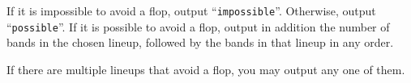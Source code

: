 
	If it is impossible to avoid a flop, output ``\texttt{impossible}''.
	Otherwise, output ``\texttt{possible}''.
	If it is possible to avoid a flop, output in addition the number of bands in the chosen lineup, followed by the bands in that lineup in any order.
	
    If there are multiple lineups that avoid a flop, you may output any one of them.
